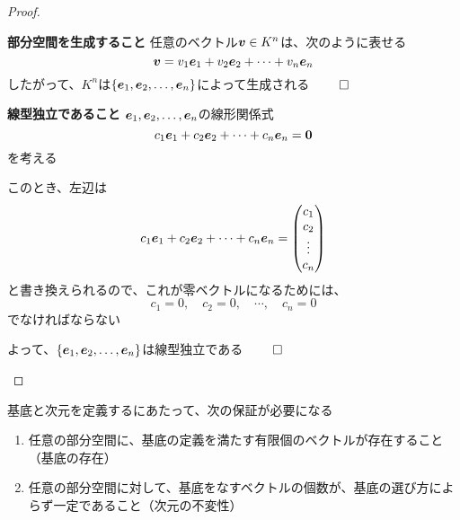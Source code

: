 \documentclass[../../../topic_linear-algebra]{subfiles}
\begin{document}
\begin{proof}
  \begin{subpattern}{\bfseries 部分空間を生成すること}
    任意のベクトル$\vb*{v} \in K^n$は、次のように表せる
    \begin{equation*}
      \vb*{v} = v_1 \vb*{e}_1 + v_2 \vb*{e}_2 + \cdots + v_n \vb*{e}_n
    \end{equation*}
    したがって、$K^n$は$\{ \vb*{e}_1, \vb*{e}_2, \dots, \vb*{e}_n \}$によって生成される $\qed$
  \end{subpattern}

  \begin{subpattern}{\bfseries 線型独立であること}
    $\vb*{e}_1, \vb*{e}_2, \dots, \vb*{e}_n$の線形関係式
    \begin{equation*}
      c_1 \vb*{e}_1 + c_2 \vb*{e}_2 + \cdots + c_n \vb*{e}_n = \vb*{0}
    \end{equation*}
    を考える

    このとき、左辺は
    \begin{equation*}
      c_1 \vb*{e}_1 + c_2 \vb*{e}_2 + \cdots + c_n \vb*{e}_n = \begin{pmatrix}
        c_1    \\
        c_2    \\
        \vdots \\
        c_n
      \end{pmatrix}
    \end{equation*}
    と書き換えられるので、これが零ベクトルになるためには、
    \begin{equation*}
      c_1 = 0, \quad c_2 = 0, \quad \cdots, \quad c_n = 0
    \end{equation*}
    でなければならない

    よって、$\{ \vb*{e}_1, \vb*{e}_2, \dots, \vb*{e}_n \}$は線型独立である $\qed$
  \end{subpattern}
\end{proof}

\sectionline

基底と次元を定義するにあたって、次の保証が必要になる

\begin{enumerate}[label=\romanlabel]
  \item 任意の部分空間に、基底の定義を満たす有限個のベクトルが存在すること（基底の存在）
  \item 任意の部分空間に対して、基底をなすベクトルの個数が、基底の選び方によらず一定であること（次元の不変性）
\end{enumerate}
\end{document}
